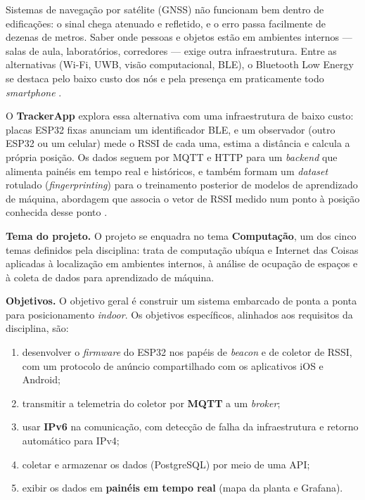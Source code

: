 \documentclass[12pt]{article}
\newcommand{\tema}{Computação} %
\begin{document}
Sistemas de navegação por satélite (GNSS) não funcionam bem dentro de edificações: o sinal chega
atenuado e refletido, e o erro passa facilmente de dezenas de metros. Saber onde pessoas e objetos
estão em ambientes internos --- salas de aula, laboratórios, corredores --- exige outra
infraestrutura. Entre as alternativas (Wi-Fi, UWB, visão computacional, BLE), o Bluetooth Low
Energy se destaca pelo baixo custo dos nós e pela presença em praticamente todo
\textit{smartphone} \cite{zafari2019survey}.

O \textbf{TrackerApp} explora essa alternativa com uma infraestrutura de baixo custo: placas
ESP32 fixas anunciam um identificador BLE, e um observador (outro ESP32 ou um celular) mede o RSSI
de cada uma, estima a distância e calcula a própria posição. Os dados seguem por MQTT e HTTP para
um \textit{backend} que alimenta painéis em tempo real e históricos, e também formam um
\textit{dataset} rotulado (\textit{fingerprinting}) para o treinamento posterior de modelos de
aprendizado de máquina, abordagem que associa o vetor de RSSI medido num ponto à posição conhecida
desse ponto \cite{bahl2000radar,faragher2015fingerprinting}.

\textbf{Tema do projeto.} O projeto se enquadra no tema \textbf{\tema}, um dos cinco temas
definidos pela disciplina: trata de computação ubíqua e Internet das Coisas aplicadas à
localização em ambientes internos, à análise de ocupação de espaços e à coleta de dados para
aprendizado de máquina.

\textbf{Objetivos.} O objetivo geral é construir um sistema embarcado de ponta a ponta para
posicionamento \textit{indoor}. Os objetivos específicos, alinhados aos requisitos da disciplina,
são:
\begin{enumerate}
  \item desenvolver o \textit{firmware} do ESP32 nos papéis de \textit{beacon} e de coletor de
    RSSI, com um protocolo de anúncio compartilhado com os aplicativos iOS e Android;
  \item transmitir a telemetria do coletor por \textbf{MQTT} a um \textit{broker};
  \item usar \textbf{IPv6} na comunicação, com detecção de falha da infraestrutura e retorno
    automático para IPv4;
  \item coletar e armazenar os dados (PostgreSQL) por meio de uma API;
  \item exibir os dados em \textbf{painéis em tempo real} (mapa da planta e Grafana).
\end{enumerate}
\end{document}
